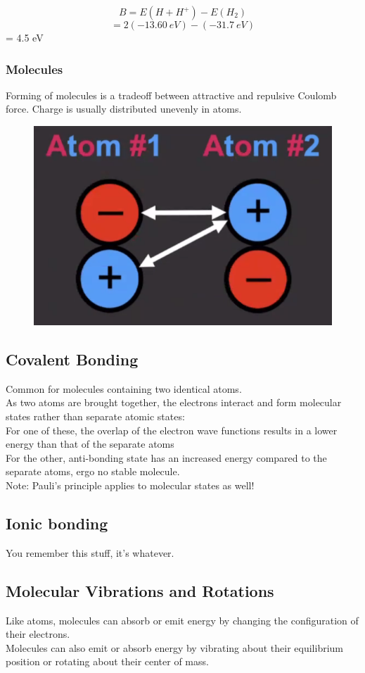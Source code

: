 \documentclass[class=article,crop=false]{standalone}
\begin{document}
\begin{question}
	$$ B = E(H + H^+) - E(H_2) $$
	$$ = 2(-13.60\ eV) - (-31.7\ eV) $$
		= 4.5 eV
\end{question}

\subsubsection{Molecules}
Forming of molecules is a tradeoff between attractive and repulsive Coulomb force. Charge is usually distributed unevenly in atoms.

\begin{figure}[h!]
	\centering
	\includegraphics[width=.6\linewidth]{./Images/atom1.png}
	\caption{}
\end{figure}

\subsection{Covalent Bonding}
Common for molecules containing two identical atoms.\\
As two atoms are brought together, the electrons interact and form molecular states rather than separate atomic states:\\
For one of these, the overlap of the electron wave functions results in a lower energy than that of the separate atoms\\
For the other, anti-bonding state has an increased energy compared to the separate atoms, ergo no stable molecule.\\
Note: Pauli's principle applies to molecular states as well!\\

\subsection{Ionic bonding}
You remember this stuff, it's whatever.


\subsection{Molecular Vibrations and Rotations}
Like atoms, molecules can absorb or emit energy by changing the configuration of their electrons. \\
Molecules can also emit or absorb energy by vibrating about their equilibrium position or rotating about their center of mass.
\end{document}
